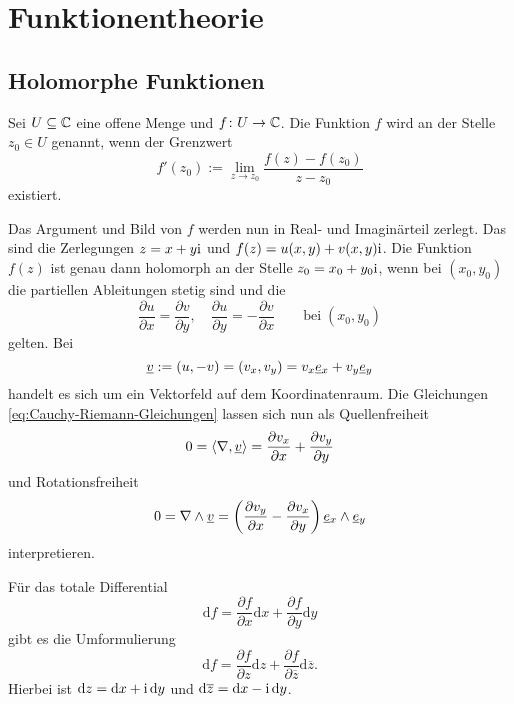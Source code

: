
\chapter{Funktionentheorie}
\section{Holomorphe Funktionen}

\begin{definition}
Sei $U\subseteq\mathbb C$ eine offene Menge und $f\colon U\to\mathbb C$.
Die Funktion $f$ wird  an der
Stelle $z_0\in U$ genannt, wenn der Grenzwert
\begin{equation}
f'(z_0) := \lim_{z\to z_0} \frac{f(z)-f(z_0)}{z-z_0}
\end{equation}
existiert.
\end{definition}

\noindent
Das Argument und Bild von $f$ werden nun in Real- und Imaginärteil
zerlegt. Das sind die Zerlegungen $z=x+y\mathrm i$ und $f(z)=u(x,y)+v(x,y)\mathrm i$.
Die Funktion $f(z)$ ist genau dann holomorph an der Stelle
$z_0=x_0+y_0\mathrm i$, wenn bei $(x_0,y_0)$ die partiellen Ableitungen
stetig sind und die 
\begin{equation}\label{eq:Cauchy-Riemann-Gleichungen}
\frac{\partial u}{\partial x}=\frac{\partial v}{\partial y},
\quad \frac{\partial u}{\partial y}=-\frac{\partial v}{\partial x}
\qquad\text{bei}\;(x_0,y_0)
\end{equation}
gelten. Bei
\begin{equation}
\underline{v} := (u,-v) = (v_x,v_y) = v_x\underline{e}{}_x+v_y\underline{e}{}_y
\end{equation}
handelt es sich um ein Vektorfeld
auf dem Koordinatenraum. Die Gleichungen
\eqref{eq:Cauchy-Riemann-Gleichungen} lassen sich nun als
Quellenfreiheit
\begin{equation}
0=\langle\nabla,\underline{v}\rangle = \frac{\partial v_x}{\partial x}+\frac{\partial v_y}{\partial y}
\end{equation}
und Rotationsfreiheit
\begin{equation}
0=\nabla\wedge \underline{v} = \bigg(\frac{\partial v_y}{\partial x}
-\frac{\partial v_x}{\partial y}\bigg)\,\underline{e}{}_x\wedge\underline{e}{}_y
\end{equation}
interpretieren.

Für das totale Differential
\begin{equation}
\mathrm df = \frac{\partial f}{\partial x}\mathrm dx+\frac{\partial f}{\partial y}\mathrm dy
\end{equation}
gibt es die Umformulierung
\begin{equation}\label{eq:Differential-Wirtinger-Operatoren}
\mathrm df = \frac{\partial f}{\partial z}\mathrm dz+\frac{\partial f}{\partial\overline z}\mathrm d\overline z.
\end{equation}
Hierbei ist $\mathrm dz=\mathrm dx+\mathrm i\,\mathrm dy$ und $\mathrm d\overline{z}=\mathrm dx-\mathrm i\,\mathrm dy$.

